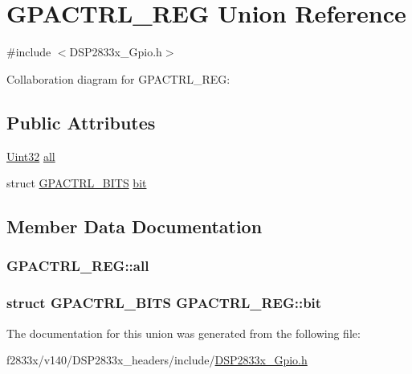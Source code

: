 \hypertarget{union_g_p_a_c_t_r_l___r_e_g}{}\section{G\+P\+A\+C\+T\+R\+L\+\_\+\+R\+E\+G Union Reference}
\label{union_g_p_a_c_t_r_l___r_e_g}


{\ttfamily \#include $<$D\+S\+P2833x\+\_\+\+Gpio.\+h$>$}



Collaboration diagram for G\+P\+A\+C\+T\+R\+L\+\_\+\+R\+E\+G\+:
\subsection*{Public Attributes}
\begin{DoxyCompactItemize}
\item 
\hyperlink{_d_s_p2833x___device_8h_aba99025e657f892beb7ff31cecf64653}{Uint32} \hyperlink{union_g_p_a_c_t_r_l___r_e_g_a2fe0bdb772eab62d30103039b13e0787}{all}
\item 
struct \hyperlink{struct_g_p_a_c_t_r_l___b_i_t_s}{G\+P\+A\+C\+T\+R\+L\+\_\+\+B\+I\+T\+S} \hyperlink{union_g_p_a_c_t_r_l___r_e_g_a6735d0cf7a08286497e508ed2be10428}{bit}
\end{DoxyCompactItemize}


\subsection{Member Data Documentation}
\hypertarget{union_g_p_a_c_t_r_l___r_e_g_a2fe0bdb772eab62d30103039b13e0787}{}
\subsubsection[{all}]{ G\+P\+A\+C\+T\+R\+L\+\_\+\+R\+E\+G\+::all}\label{union_g_p_a_c_t_r_l___r_e_g_a2fe0bdb772eab62d30103039b13e0787}
\hypertarget{union_g_p_a_c_t_r_l___r_e_g_a6735d0cf7a08286497e508ed2be10428}{}
\subsubsection[{bit}]{\setlength{\rightskip}{0pt plus 5cm}struct {\bf G\+P\+A\+C\+T\+R\+L\+\_\+\+B\+I\+T\+S} G\+P\+A\+C\+T\+R\+L\+\_\+\+R\+E\+G\+::bit}\label{union_g_p_a_c_t_r_l___r_e_g_a6735d0cf7a08286497e508ed2be10428}


The documentation for this union was generated from the following file\+:\begin{DoxyCompactItemize}
\item 
f2833x/v140/\+D\+S\+P2833x\+\_\+headers/include/\hyperlink{_d_s_p2833x___gpio_8h}{D\+S\+P2833x\+\_\+\+Gpio.\+h}\end{DoxyCompactItemize}

